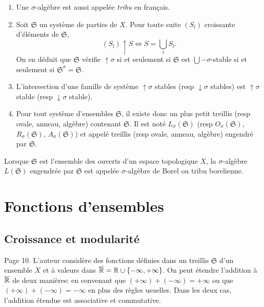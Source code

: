 \begin{rems}
\begin{enumerate}
 \item Une $\sigma$-algèbre est aussi appelée \emph{tribu} en français.
 \item Soit $\mathfrak{S}$ un système de parties de $X$. Pour toute suite $(S_l)$ croissante d'éléments de $\mathfrak{S}$,
   \begin{displaymath}
     (S_l)\uparrow S \Leftrightarrow  S = \bigcup_l S_l.
   \end{displaymath}
  On en déduit que $\mathfrak{S}$ vérifie $\uparrow \sigma$ si et seulement si $\mathfrak{S}$ est $\bigcup - \sigma$-stable si et seulement si $\mathfrak{S}^\sigma = \mathfrak{S}$.
 \item L'intersection d'une famille de système $\uparrow \sigma$ stables (resp $\downarrow \sigma$ stables) est $\uparrow \sigma$ stable (resp $\downarrow \sigma$ stable).
 \item Pour tout système d'ensembles $\mathfrak{S}$, il existe donc un plus petit treillis (resp ovale, anneau, algèbre) contenant $\mathfrak{S}$. Il est noté $L_\sigma(\mathfrak{S})$ (resp $O_\sigma(\mathfrak{S})$, $R_\sigma(\mathfrak{S})$, $A_\sigma(\mathfrak{S})$) et appelé treillis (resp ovale, anneau, algèbre) engendré par $\mathfrak{S}$.
\end{enumerate}
\end{rems}
\begin{exple}
Lorsque $\mathfrak{S}$ est l'ensemble des ouverts d'un espace topologique $X$, la $\sigma$-algèbre $L(\mathfrak{S})$ engendrée par $\mathfrak{S}$ est appelée $\sigma$-algèbre de Borel ou tribu borelienne.
\end{exple}

\section{Fonctions d'ensembles}\label{FoncEns}
\subsection{Croissance et modularité}
Page 10. L'auteur considère des fonctions définies dans un treillis $\mathfrak{S}$ d'un ensemble $X$ et à valeurs dans $\overline{\mathbb{R}}= \mathbb{R} \cup\{- \infty, + \infty\} $. On peut étendre l'addition à $\overline{\mathbb{R}}$ de deux manières: en convenant que $(+ \infty) + (-\infty) = + \infty$ ou que $(+ \infty) + (-\infty) = - \infty$ en plus des règles usuelles. Dans les deux cas, l'addition étendue est associative et commutative.

